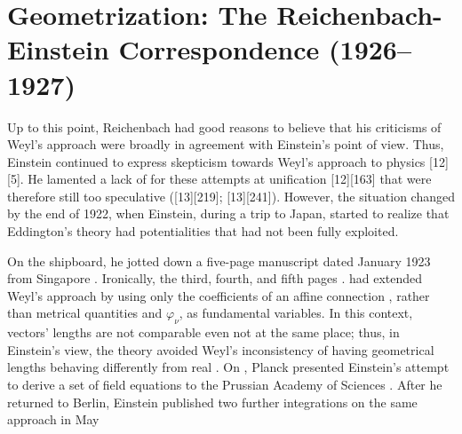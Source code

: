 \documentclass[final]{article}
\newcommand{\phin}{\ensuremath{\varphi_\nu}\xspace}
\begin{document}
\section{Geometrization: The Reichenbach-Einstein Correspondence (1926--1927)}
\label{geometrization}
%
Up to this point, Reichenbach had good reasons to believe that his criticisms of Weyl's approach were broadly in agreement with Einstein's point of view. Thus, Einstein continued to express skepticism towards Weyl's  approach to physics  [12][5]. He lamented a lack of  for these attempts at unification [12][163] that were therefore still too speculative ([13][219]; [13][241]). However, the situation changed by the end of 1922, when Einstein, during a trip to Japan, started to realize that Eddington's theory had potentialities that had not been fully exploited. 

On the shipboard, he jotted down a five-page manuscript dated January 1923 from Singapore . Ironically, the third, fourth, and fifth pages  \citep{Reichenbach1921}. \citet{Eddington1921} had extended Weyl's approach by using only the coefficients of an affine connection \Gtmn, rather than metrical quantities \gmn and \phin, as fundamental variables. In this context, vectors' lengths are not comparable even not at the same place; thus, in Einstein's view, the theory avoided Weyl's inconsistency of having geometrical lengths behaving differently from real \rac. On , Planck presented Einstein's attempt to derive a set of field equations to the Prussian Academy of Sciences \citep{Einstein1923c}. After he returned to Berlin, Einstein published two further integrations on the same approach in May \cite{Einstein1923c,Einstein1923e}
\end{document}
